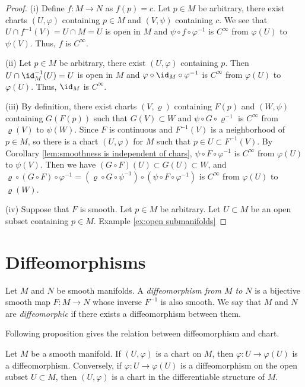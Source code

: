\begin{proof}
    (i) Define $f : M \to N$ as $f(p) = c$. Let $p \in M$ be arbitrary, there exist charts $(U, \varphi)$ containing $p \in M$ and $(V, \psi)$ containing $c$. We see that $U \cap f^{-1}(V) = U \cap M = U$ is open in $M$ and $\psi \circ f \circ\varphi^{-1}$ is $C^\infty$ from $\varphi(U)$ to $\psi(V)$. Thus, $f$ is $C^\infty$.

    (ii) Let $p \in M$ be arbitrary, there exist $(U, \varphi)$ containing $p$. Then $U \cap \id_M^{-1}(U) = U$ is open in $M$ and $\varphi \circ \id_M \circ \varphi^{-1}$ is $C^\infty$ from $\varphi(U)$ to $\varphi(U)$. Thus, $\id_M$ is $C^\infty$.

    (iii) By definition, there exist charts $(V, \varrho)$ containing $F(p)$ and $(W, \psi)$ containing $G(F(p))$ such that $G(V) \subset W$ and $\psi \circ G \circ \varrho^{-1}$ is $C^\infty$ from $\varrho(V)$ to $\psi(W)$. Since $F$ is continuous and $F^{-1}(V)$ is a neighborhood of $p \in M$, so there is a chart $(U, \varphi)$ for $M$ such that $p \in U \subset F^{-1}(V)$. By Corollary \ref{lem:smoothness is independent of chars}, $\psi \circ F \circ \varphi^{-1}$ is $C^\infty$ from $\varphi(U)$ to $\psi(V)$. Then we have $(G \circ F)(U) \subset G(U) \subset W$, and $\varrho \circ (G \circ F) \circ \varphi^{-1} = (\varrho \circ G \circ \psi^{-1}) \circ (\psi \circ F \circ \varphi^{-1})$ is $C^\infty$ from $\varphi(U)$ to $\varrho(W)$.

    (iv) Suppose that $F$ is smooth. Let $p \in M$ be arbitrary. Let $U \subset M$ be an open subset containing $p \in M$. 
    Example \ref{ex:open submanifolds}
\end{proof}

\section{Diffeomorphisms}

\begin{definition}[Diffeomorphism]
    Let $M$ and $N$ be smooth manifolds. A \emph{diffeomorphism from $M$ to $N$} is a bijective smooth map $F : M \to N$ whose inverse $F^{-1}$ is also smooth. We say that $M$ and $N$ are \emph{diffeomorphic} if there exists a diffeomorphism between them.
\end{definition}

Following proposition gives the relation between diffeomorphism and chart.

\begin{proposition}\label{lem:chart map is diffeomorphism}
    Let $M$ be a smooth manifold. If $(U, \varphi)$ is a chart on $M$, then $\varphi : U \to \varphi(U)$ is a diffeomorphism. Conversely, if $\varphi : U \to \varphi(U)$ is a diffeomorphism on the open subset $U \subset M$, then $(U, \varphi)$ is a chart in the differentiable structure of $M$.
\end{proposition}

